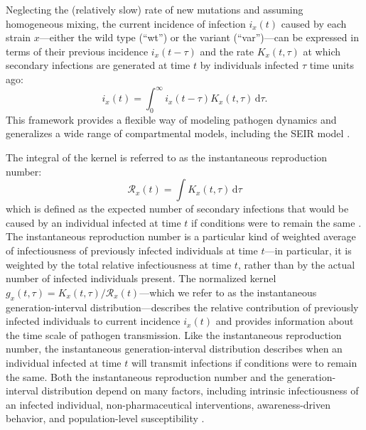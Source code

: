 \documentclass[12pt]{article}
\newcommand{\RR}{\ensuremath{{\mathcal R}}\xspace}
\newcommand{\dd}[1]{\ensuremath{\, \mathrm{d}#1}}
\newcommand{\dtau}{\dd{\tau}}
\begin{document}
Neglecting the (relatively slow) rate of new mutations and assuming homogeneous mixing, the current incidence of infection $i_x(t)$ caused by each strain $x$---either the wild type (``wt'') or the variant (``var'')---can be expressed in terms of their previous incidence $i_x(t-\tau)$ and the rate $K_x(t, \tau)$ at which secondary infections are generated at time $t$ by individuals infected $\tau$ time units ago:
\begin{equation}
i_x(t) = \int_0^\infty i_x(t-\tau) K_x(t, \tau) \dtau.
\end{equation}
This framework provides a flexible way of modeling pathogen dynamics and generalizes a wide range of compartmental models, including the SEIR model \citep{heesterbeek1996concept, diekmann2000mathematical, roberts2004modelling, aldis2005integral,breda2012formulation, champredon2018equivalence}.

The integral of the kernel is referred to as the instantaneous reproduction number:
\begin{equation}
\RR_x(t) = \int K_x(t, \tau) \dtau
\label{eq:instR}
\end{equation}
which is defined as the expected number of secondary infections that would be caused by an individual infected at time $t$ if conditions were to remain the same \citep{fraser2007estimating}.
The instantaneous reproduction number is a particular kind of weighted average of infectiousness of previously infected individuals at time $t$---in particular, it is weighted by the total relative infectiousness at time $t$, rather than by the actual number of infected individuals present.
The normalized kernel $g_x(t, \tau) = K_x(t, \tau)/\RR_x(t)$---which we refer to as the instantaneous generation-interval distribution---describes the relative contribution of previously infected individuals to current incidence $i_x(t)$ and provides information about the time scale of pathogen transmission.
Like the instantaneous reproduction number, the instantaneous generation-interval distribution describes when an individual infected at time $t$ will transmit infections if conditions were to remain the same.
Both the instantaneous reproduction number and the generation-interval distribution depend on many factors, including intrinsic infectiousness of an infected individual, non-pharmaceutical interventions, awareness-driven behavior, and population-level susceptibility \citep{fraser2007estimating}.
\end{document}
